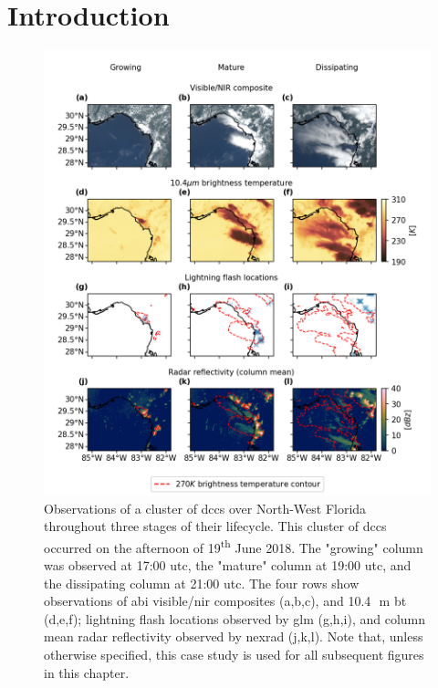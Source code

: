 
\section{Introduction} %

\begin{figure}[t]
    \includegraphics[width=\textwidth]{figures/chapter1_01.png}
    \caption[
    Observations of a cluster of \acrshort{dcc}s over North-West Florida throughout three stages of their lifecycle
    ]{
    Observations of a cluster of \acrshort{dcc}s over North-West Florida throughout three stages of their lifecycle. This cluster of \acrshort{dcc}s occurred on the afternoon of 19\textsuperscript{th} June 2018. The "growing" column was observed at 17:00 \acrshort{utc}, the "mature" column at 19:00 \acrshort{utc}, and the dissipating column at 21:00 \acrshort{utc}. The four rows show observations of \acrshort{abi} visible/\acrshort{nir} composites (a,b,c), and 10.4\,\unit{\mu m} \acrshort{bt} (d,e,f); lightning flash locations observed by \acrshort{glm} (g,h,i), and column mean radar reflectivity observed by \acrshort{nexrad} (j,k,l). Note that, unless otherwise specified, this case study is used for all subsequent figures in this chapter.
    }
    \label{fig:compare_sat_radar_glm}
\end{figure}


